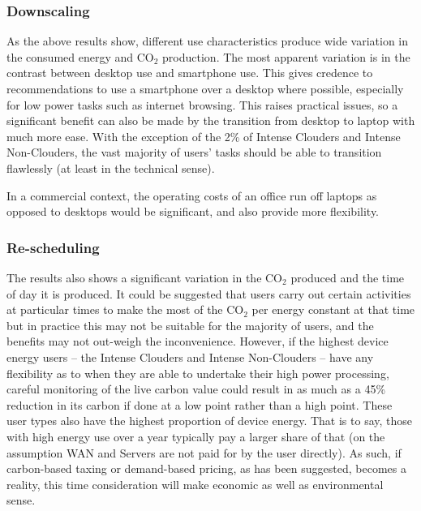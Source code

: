 \documentclass[conference]{IEEEtran}
\begin{document}
\subsubsection{Downscaling}

As the above results show, different use characteristics produce wide
variation in the consumed energy and CO$_2$ production. The most
apparent variation is in the contrast between desktop use and
smartphone use. This gives credence to recommendations to use a
smartphone over a desktop where possible, especially for low power
tasks such as internet browsing. This raises practical issues, so a
significant benefit can also be made by the transition from desktop to
laptop with much more ease. With the exception of the 2\% of Intense
Clouders and Intense Non-Clouders, the vast majority of users' tasks
should be able to transition flawlessly (at least in the technical
sense).


In a commercial context, the operating costs of an office run off
laptops as opposed to desktops would be significant, and also provide
more flexibility.

\subsubsection{Re-scheduling}

The results also shows a significant variation in the CO$_2$ produced
and the time of day it is produced. It could be suggested that users
carry out certain activities at particular times to make the most of
the CO$_2$ per energy constant at that time but in practice this may
not be suitable for the majority of users, and the benefits may not
out-weigh the inconvenience. However, if the highest device energy
users -- the Intense Clouders and Intense Non-Clouders -- have any
flexibility as to when they are able to undertake their high power
processing, careful monitoring of the live carbon value could result
in as much as a 45\% reduction in its carbon if done at a low point
rather than a high point. These user types also have the highest
proportion of device energy. That is to say, those with high energy
use over a year typically pay a larger share of that (on the
assumption WAN and Servers are not paid for by the user directly). As
such, if carbon-based taxing or demand-based pricing, as has been
suggested, becomes a reality, this time consideration will make
economic as well as environmental sense.
\end{document}
